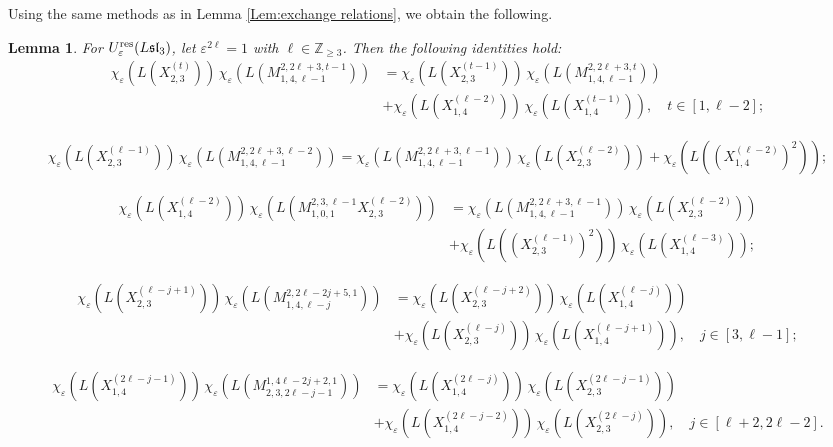 \documentclass[11pt, reqno]{amsart}
\theoremstyle{plain}
\newtheorem{lemma}[theorem]{Lemma}
\theoremstyle{definition}
\numberwithin{equation}{section}
\newcommand{\res}{{\rm res}}
\begin{document}
Using the same methods as in Lemma \ref{Lem:exchange relations}, we obtain the following.
\begin{lemma}\label{lem: identities hold of type A2}
For $U_{\varepsilon}^{\res}(L\mathfrak{sl}_3)$, let $\varepsilon^{2\ell} = 1$ with $\ell \in \mathbb{Z}_{\ge 3}$. Then the following identities hold:  
{\small
\begin{align}
\chi_\varepsilon(L(X^{(t)}_{2,3}))\,\chi_\varepsilon(L(M^{2,2\ell+3,t-1}_{1,4,\ell-1}))
&=\chi_\varepsilon(L(X^{(t-1)}_{2,3}))\,\chi_\varepsilon(L(M^{2,2\ell+3,t}_{1,4,\ell-1}))\nonumber \\ 
&+\chi_\varepsilon(L(X^{(\ell-2)}_{1,4}))\,\chi_\varepsilon(L(X^{(t-1)}_{1,4})), \quad t\in[1,\ell-2];
\end{align}}

{\small
\begin{align}
\chi_\varepsilon(L(X^{(\ell-1)}_{2,3}))
\,\chi_\varepsilon(L(M^{2,2\ell+3,\ell-2}_{1,4,\ell-1}))=\chi_\varepsilon(L(M^{2,2\ell+3,\ell-1}_{1,4,\ell-1}))
\,\chi_\varepsilon(L(X^{(\ell-2)}_{2,3}))+\chi_\varepsilon(L((X^{(\ell-2)}_{1,4})^2));
\end{align}}

{\small
\begin{align}
\chi_\varepsilon(L(X^{(\ell-2)}_{1,4}))\,\chi_\varepsilon(L(M^{2,3,\ell-1}_{1,0,1}X^{(\ell-2)}_{2,3}))
&=\chi_\varepsilon(L(M^{2,2\ell+3,\ell-1}_{1,4,\ell-1}))\,\chi_\varepsilon(L(X^{(\ell-2)}_{2,3}))\nonumber\\ 
&+\chi_\varepsilon(L((X^{(\ell-1)}_{2,3})^2))\,\chi_\varepsilon(L(X^{(\ell-3)}_{1,4}));
\end{align}}

{\small
\begin{align}
\chi_\varepsilon(L(X^{(\ell-j+1)}_{2,3}))\,\chi_\varepsilon(L(M^{2,2\ell-2j+5,1}_{1,4,\ell-j}))
&=\chi_\varepsilon(L(X^{(\ell-j+2)}_{2,3}))\,\chi_\varepsilon(L(X^{(\ell-j)}_{1,4}))\nonumber\\
&+\chi_\varepsilon(L(X^{(\ell-j)}_{2,3}))\,\chi_\varepsilon(L(X^{(\ell-j+1)}_{1,4})),\quad j\in[3,\ell-1];
\end{align}}

{\small
\begin{align}
\chi_\varepsilon(L(X^{(2\ell-j-1)}_{1,4}))\,\chi_\varepsilon(L(M^{1,4\ell-2j+2,1}_{2,3,2\ell-j-1}))
&=\chi_\varepsilon(L(X^{(2\ell-j)}_{1,4}))\,\chi_\varepsilon(L(X^{(2\ell-j-1)}_{2,3}))\nonumber\\
&+\chi_\varepsilon(L(X^{(2\ell-j-2)}_{1,4}))\,\chi_\varepsilon(L(X^{(2\ell-j)}_{2,3})),\quad
j\in[\ell+2,2\ell-2].
\end{align}}
\end{lemma}
\end{document}
